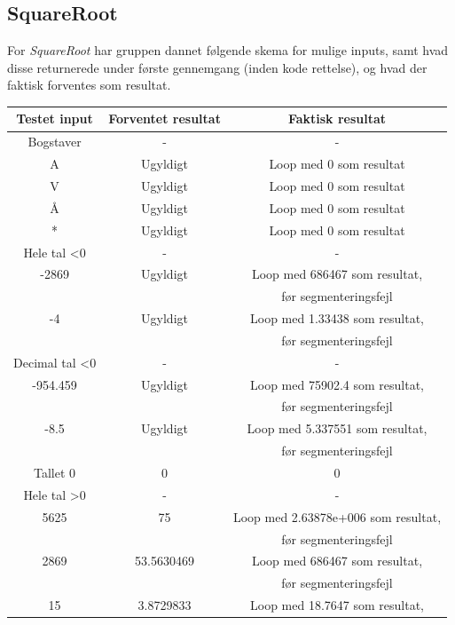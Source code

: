 \documentclass[11pt]{article}
\begin{document}
    \subsection{SquareRoot}
    For \textit{SquareRoot} har gruppen dannet følgende skema for mulige inputs, samt hvad disse returnerede under første gennemgang (inden kode rettelse), og hvad der faktisk forventes som resultat.
    \begin{center}
        \begin{tabular}{ |c|c|c| }
            \hline
             Testet input & Forventet resultat & Faktisk resultat \\
            \hline
             Bogstaver & - & - \\
              A & Ugyldigt & Loop med 0 som resultat\\
              V & Ugyldigt & Loop med 0 som resultat \\
              Å & Ugyldigt & Loop med 0 som resultat \\
              * & Ugyldigt & Loop med 0 som resultat \\
             Hele tal \textless 0 & - & - \\ 
              -2869 & Ugyldigt & Loop med 686467 som resultat,\\ 
              && før segmenteringsfejl\\
              -4 & Ugyldigt & Loop med 1.33438 som resultat,\\ 
              && før segmenteringsfejl \\
             Decimal tal \textless 0 & - & -\\
              -954.459 & Ugyldigt & Loop med 75902.4 som resultat,\\ 
              && før segmenteringsfejl\\
              -8.5 & Ugyldigt & Loop med 5.337551 som resultat,\\ 
              && før segmenteringsfejl \\
             Tallet 0 & 0 & 0 \\
             Hele tal \textgreater 0 & - & - \\
              5625 & 75 & Loop med 2.63878e+006 som resultat,\\ 
              && før segmenteringsfejl \\
              2869 & 53.5630469 & Loop med 686467 som resultat,\\ 
              && før segmenteringsfejl \\
              15 & 3.8729833 & Loop med 18.7647 som resultat,\\ 

\end{tabular}
\end{center}
\end{document}
